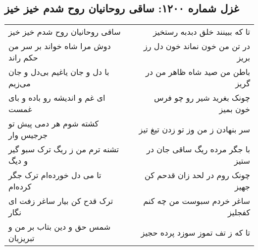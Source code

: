 \begin{center}
\section*{غزل شماره ۱۲۰۰: ساقی روحانیان روح شدم خیز خیز}
\label{sec:1200}
\begin{longtable}{l p{0.5cm} r}
ساقی روحانیان روح شدم خیز خیز
&&
تا که ببینند خلق دبدبه رستخیز
\\
دوش مرا شاه خواند بر سر من حکم راند
&&
در تن من خون نماند خون دل رز بریز
\\
با دل و جان یاغیم بی‌دل و جان می‌زیم
&&
باطن من صید شاه ظاهر من در گریز
\\
ای غم و اندیشه رو باده و بای غمست
&&
چونک بغرید شیر رو چو فرس خون بمیز
\\
کشته شوم هر دمی پیش تو جرجیس وار
&&
سر بنهادن ز من وز تو زدن تیغ تیز
\\
تشنه ترم من ز ریگ ترک سبو گیر و دیگ
&&
با جگر مرده ریگ ساقی جان در ستیز
\\
تا می دل خورده‌ام ترک جگر کرده‌ام
&&
چونک روم در لحد زان قدحم کن جهیز
\\
ترک قدح کن بیار ساغر زفت ای نگار
&&
ساغر خردم سبوست من چه کنم کفجلیز
\\
شمس حق و دین بتاب بر من و تبریزیان
&&
تا که ز تف تموز سوزد پرده حجیز
\\
\end{longtable}
\end{center}
